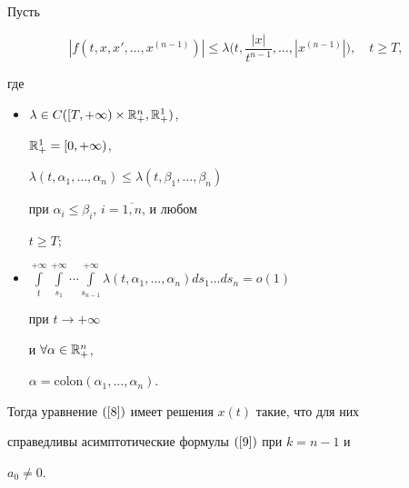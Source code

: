 \begin{thm}\label{T_10}


Пусть


$$


|f(t,x,x',\ldots,x^{(n-1)})|\leq


\lambda\bigg(t,\frac{|x|}{t^{n-1}},\dotsc,|x^{(n-1)}|\bigg),


\quad t \geq T,


$$


где


\begin{itemize}


\item[a)] $\lambda\in C([T,+\infty)\times {\Bbb R}_{+}^{n},{\Bbb R}_{+}^{1})$,


${\Bbb R}_{+}^{1}=[0,+\infty)$,


$\lambda(t,\alpha_{1},\dotsc,\alpha_{n})\leq


\lambda(t,\beta_{1},\dotsc,\beta_{n})$


при $\alpha_{i} \leq \beta_{i}$, $i=\overline{1,n}$, и любом


$t \geq T;$


\item[b)] $ \int\limits_{t}^{+\infty}\int\limits_{s_{1}}^{+\infty}\dotsb


\int\limits_{s_{n-1}}^{+\infty}


\lambda(t,\alpha_{1},\dotsc,\alpha_{n})ds_{1}\dotsc ds_{n}=o(1)$


при $ t \rightarrow +\infty$


и $\forall\alpha \in {\Bbb R}_{+}^{n}$,


$\alpha=\mathrm{colon}(\alpha_{1},\dotsc,\alpha_{n})$.


\end{itemize}





Тогда уравнение $(\ref{8})$ имеет решения $x(t)$ такие, что для них


справедливы асимптотические формулы $(\ref{9})$ при $k=n-1$ и


$a_{0}\ne0$.


\end{thm}





